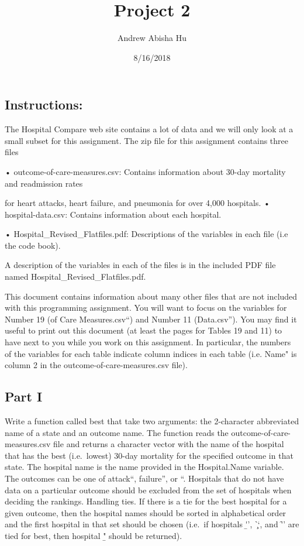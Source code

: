 \documentclass[]{article}
\title{Project 2}
\author{Andrew Abisha Hu}
\date{8/16/2018}
\begin{document}
\maketitle

\subsection{\texorpdfstring{\textbf{Instructions:}}{Instructions:}}\label{instructions}

The Hospital Compare web site contains a lot of data and we will only
look at a small subset for this assignment. The zip file for this
assignment contains three files

• outcome-of-care-measures.csv: Contains information about 30-day
mortality and readmission rates

for heart attacks, heart failure, and pneumonia for over 4,000
hospitals. • hospital-data.csv: Contains information about each
hospital.

• Hospital\_Revised\_Flatfiles.pdf: Descriptions of the variables in
each file (i.e the code book).

A description of the variables in each of the files is in the included
PDF file named Hospital\_Revised\_Flatfiles.pdf.

This document contains information about many other files that are not
included with this programming assignment. You will want to focus on the
variables for Number 19 (\Outcome of Care Measures.csv``) and Number 11
(\Hospital Data.csv''). You may find it useful to print out this
document (at least the pages for Tables 19 and 11) to have next to you
while you work on this assignment. In particular, the numbers of the
variables for each table indicate column indices in each table (i.e.
\Hospital Name" is column 2 in the outcome-of-care-measures.csv file).

\subsection{Part I}\label{part-i}

Write a function called best that take two arguments: the 2-character
abbreviated name of a state and an outcome name. The function reads the
outcome-of-care-measures.csv file and returns a character vector with
the name of the hospital that has the best (i.e.~lowest) 30-day
mortality for the specified outcome in that state. The hospital name is
the name provided in the Hospital.Name variable. The outcomes can be one
of \heart attack``, \heart failure'', or \pneumonia``. Hospitals that do
not have data on a particular outcome should be excluded from the set of
hospitals when deciding the rankings. Handling ties. If there is a tie
for the best hospital for a given outcome, then the hospital names
should be sorted in alphabetical order and the first hospital in that
set should be chosen (i.e.~if hospitals \b'', \c``, and \f'' are tied
for best, then hospital \b" should be returned).
\end{document}
